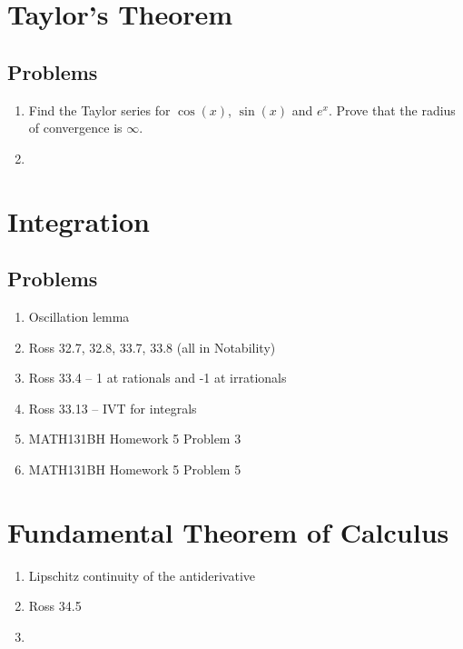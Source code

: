 \documentclass{article}
\theoremstyle{definition}
\begin{document}
\newpage 

\section{Taylor's Theorem}



\subsection{Problems}

\begin{enumerate}
    \item Find the Taylor series for $\cos(x)$, $\sin(x)$ and $e^{x}$.
    Prove that the radius of convergence is $\infty$.
    \item 
\end{enumerate}

\newpage

\section{Integration}

\subsection{Problems}

\begin{enumerate}
    \item Oscillation lemma
    \item Ross 32.7, 32.8, 33.7, 33.8 (all in Notability)
    \item Ross 33.4 -- 1 at rationals and -1 at irrationals
    \item Ross 33.13 -- IVT for integrals
    \item MATH131BH Homework 5 Problem 3
    \item MATH131BH Homework 5 Problem 5
\end{enumerate}

\newpage

\section{Fundamental Theorem of Calculus}

\begin{enumerate}
    \item Lipschitz continuity of the antiderivative
    \item Ross 34.5
    \item 
\end{enumerate}
\end{document}
